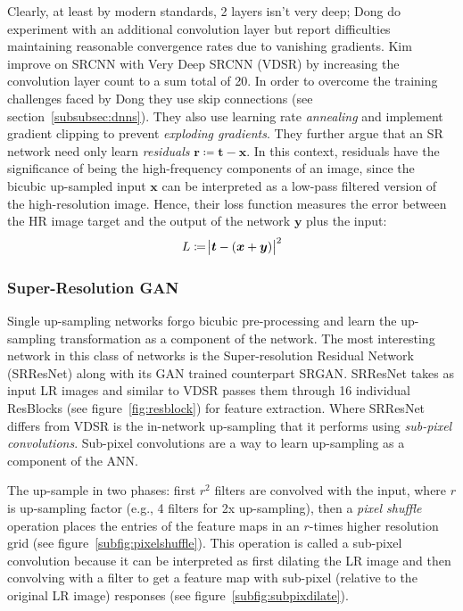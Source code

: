 Clearly, at least by modern standards, 2 layers isn't very deep; Dong \etal do experiment with an additional convolution layer but report difficulties maintaining reasonable convergence rates due to vanishing gradients.
%
Kim \etal\cite{Kim_2016} improve on SRCNN with Very Deep SRCNN (VDSR) by increasing the convolution layer count to a sum total of 20.
%
In order to overcome the training challenges faced by Dong \etal they use skip connections (see section~\ref{subsubsec:dnns}).
%
They also use learning rate \textit{annealing} and implement gradient clipping to prevent \textit{exploding gradients}.
%
They further argue that an SR network need only learn \textit{residuals} \(\bm{r} \coloneqq \bm{t} - \bm{x}\).
%
In this context, residuals have the significance of being the high-frequency components of an image, since the bicubic up-sampled input \(\bm{x}\) can be interpreted as a low-pass filtered version of the high-resolution image.
%
Hence, their loss function measures the error between the HR image target and the output of the network \(\bm{y}\) plus the input:
\begin{equation}
    L \coloneqq \abs{\bm{t} - (\bm{x} + \bm{y})}^2
\end{equation}

\subsubsection{Super-Resolution GAN}\label{subsubsec:srgan}
Single up-sampling networks forgo bicubic pre-processing and learn the up-sampling transformation as a component of the network.
%
The most interesting network in this class of networks is the Super-resolution Residual Network (SRResNet) along with its GAN trained counterpart SRGAN\cite{Ledig_2017}.
%
SRResNet takes as input LR images and similar to VDSR passes them through 16 individual ResBlocks (see figure~\ref{fig:resblock}) for feature extraction.
%
Where SRResNet differs from VDSR is the in-network up-sampling that it performs using \textit{sub-pixel convolutions}.
%
Sub-pixel convolutions are a way to learn up-sampling as a component of the ANN.

%
The up-sample in two phases: first \(r^2\) filters are convolved with the input, where \(r\) is up-sampling factor (e.g., 4 filters for 2x up-sampling), then a \textit{pixel shuffle} operation places the entries of the feature maps in an \(r\)-times higher resolution grid (see figure~\ref{subfig:pixelshuffle}).
%
This operation is called a sub-pixel convolution because it can be interpreted as first dilating the LR image and then convolving with a filter to get a feature map with sub-pixel (relative to the original LR image) responses (see figure~\ref{subfig:subpixdilate}).

